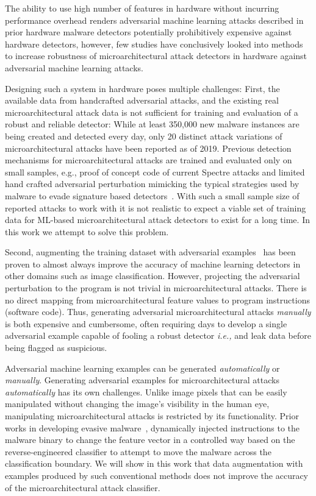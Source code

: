 The ability to use high number of features in hardware without incurring performance overhead renders adversarial machine learning attacks
described in prior hardware malware detectors potentially prohibitively expensive against hardware detectors,
however, few studies have conclusively looked into methods to increase robustness of  microarchitectural attack detectors in hardware against adversarial machine learning attacks. 


Designing such a system in hardware poses multiple challenges: First, the available data from handcrafted adversarial attacks, and the existing real microarchitectural attack data is not sufficient for training and evaluation of a robust and reliable detector: While at least 350,000 new malware instances are being created and detected every day, only 20 distinct attack variations of microarchitectural attacks have been reported as of 2019. 
Previous detection mechanisms for microarchitectural attacks are trained and evaluated only on small samples, e.g., proof of concept code of current Spectre attacks and limited hand crafted adversarial perturbation mimicking the typical strategies 
used by malware to evade signature based
detectors~\cite{PaulKocher,paulKocherSpectreAttacks}. With such a small sample size of reported attacks to work with it is not realistic to expect a viable set of training data for ML-based microarchitectural attack detectors to exist for a long time. In this work we attempt to solve this problem. 



Second, augmenting the training dataset with adversarial examples~\cite{szegedy2014going, Goodfellow2015ADVexample, moosavidezfooli2016deepfool} has been proven to almost always improve the accuracy of machine learning detectors in other domains such as image classification. However,  projecting the adversarial perturbation to the program is not trivial in microarchitectural attacks. There is no direct mapping from microarchitectural feature values to program instructions (software code). Thus, generating adversarial microarchitectural attacks {\em manually} is both expensive and cumbersome, often requiring days to develop a single adversarial example capable of fooling a robust detector {\em i.e.,} and leak data before being flagged as suspicious. 

Adversarial machine learning examples can be generated {\em automatically}  or {\em manually}. Generating adversarial examples for microarchitectural attacks {\em automatically} has its own challenges.  
Unlike image pixels that can be easily manipulated without changing the image's visibility in the human eye, manipulating microarchitectural attacks is restricted by its functionality. 
Prior works in developing evasive malware~\cite{RHMD2017}, dynamically injected instructions to the malware binary to change the feature vector in a controlled way based on the reverse-engineered classifier to attempt to move the malware across the classification boundary. We will show in this work that data augmentation with examples produced by such conventional methods does not improve the accuracy of the microarchitectural attack classifier. 

